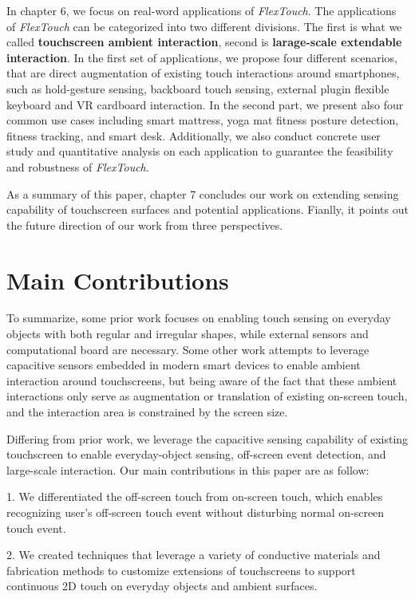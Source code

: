 In chapter 6, we focus on real-word applications of \textit{FlexTouch}. The applications of \textit{FlexTouch} can be categorized into two different divisions. The first is what we called \textbf{touchscreen ambient interaction}, second is \textbf{larage-scale extendable interaction}. In the first set of applications, we propose four different scenarios, that are direct augmentation of existing touch interactions around smartphones, such as hold-gesture sensing, backboard touch sensing, external plugin flexible keyboard and VR cardboard interaction. In the second part, we present also four common use cases including smart mattress, yoga mat fitness posture detection, fitness tracking, and smart desk. Additionally, we also conduct concrete user study and quantitative analysis on each application to guarantee the feasibility and robustness of \textit{FlexTouch}.  

As a summary of this paper, chapter 7 concludes our work on extending sensing capability of touchscreen surfaces and potential applications. Fianlly, it points out the future direction of our work from three perspectives.

\section{Main Contributions}
To summarize, some prior work focuses on enabling touch sensing on everyday objects with both regular and irregular shapes, while external sensors and computational board are necessary. Some other work attempts to leverage capacitive sensors embedded in modern smart devices to enable ambient interaction around touchscreens, but being aware of the fact that these ambient interactions only serve as augmentation or translation of existing on-screen touch, and the interaction area is constrained by the screen size. 


Differing from prior work, we leverage the capacitive sensing capability of existing touchscreen to enable everyday-object sensing, off-screen event detection, and large-scale interaction. Our main contributions in this paper are as follow:

1. We differentiated the off-screen touch from on-screen touch, which enables recognizing user's off-screen touch event without disturbing normal on-screen touch event. 

2. We created techniques that leverage a variety of conductive materials and fabrication methods to customize extensions of touchscreens to support continuous 2D touch on everyday objects and ambient surfaces.

